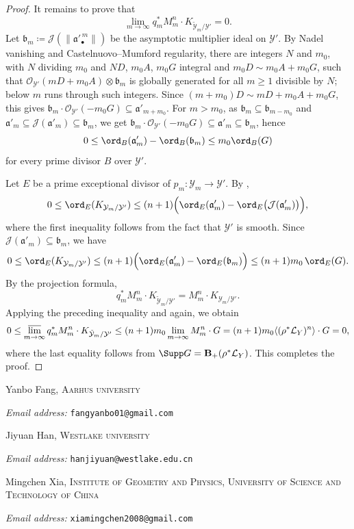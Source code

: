 \documentclass[11pt,a4paper]{article}
\begin{document}
\begin{proof}
It remains to prove that
\[
    \lim_{m\to\infty}q_m^*M_m^n\cdot K_{\tilde{\mathcal{Y}}_m/\mathcal{Y}'} = 0.
\]
Let $\mathfrak{b}_m\coloneqq\mathcal{J}(\|\mathfrak{a}'^{\,m}_{\bullet}\|)$ be the asymptotic multiplier ideal on $\mathcal{Y}'$. By Nadel vanishing and Castelnuovo--Mumford regularity, there are integers $N$ and $m_0$, with $N$ dividing $m_0$ and $ND$, $m_0A$, $m_0G$ integral and $m_0D\sim m_0A+m_0G$, such that $\mathcal{O}_{\mathcal{Y}'}(mD+m_0A)\otimes\mathfrak{b}_m$ is globally generated for all $m\geq1$ divisible by $N$; below $m$ runs through such integers. Since $(m+m_0)D\sim mD+m_0A+m_0G$, this gives $\mathfrak{b}_m\cdot\mathcal{O}_{\mathcal{Y}'}(-m_0G)\subseteq\mathfrak{a}'_{m+m_0}$. For $m>m_0$, as $\mathfrak{b}_m\subseteq\mathfrak{b}_{m-m_0}$ and $\mathfrak{a}'_m\subseteq\mathcal{J}(\mathfrak{a}'_m)\subseteq\mathfrak{b}_m$, we get $\mathfrak{b}_m\cdot\mathcal{O}_{\mathcal{Y}'}(-m_0G)\subseteq\mathfrak{a}'_m\subseteq\mathfrak{b}_m$, hence
\[
 0\leq\ord_B(\mathfrak{a}'_m)-\ord_B(\mathfrak{b}_m)\leq m_0\ord_B(G)
\]
for every prime divisor $B$ over $\mathcal{Y}'$.

Let $E$ be a prime exceptional divisor of $p_m\colon \mathcal{Y}_m\rightarrow \mathcal{Y}'$. By \cite[Proposition~A.1]{T26App}, 
\[
  0\leq  \ord_E(K_{\mathcal{Y}_m/\mathcal{Y}'})\leq (n+1)\Bigl(\ord_E(\mathfrak{a}'_m)-\ord_E\bigl(\mathcal{J}(\mathfrak{a}'_m)\bigr)\Bigr),
\]
where the first inequality follows from the fact that $\mathcal{Y}'$ is smooth. Since $\mathcal{J}(\mathfrak{a}'_m)\subseteq\mathfrak{b}_m$, we have
\[
    0\leq  \ord_E(K_{\mathcal{Y}_m/\mathcal{Y}'})\leq (n+1)\Bigl(\ord_E(\mathfrak{a}'_m)-\ord_E(\mathfrak{b}_m)\Bigr) \leq (n+1)m_0\,\ord_E(G).
\]
By the projection formula,
\[
    q_m^*M_m^n\cdot K_{\tilde{\mathcal{Y}}_m/\mathcal{Y}'} = M_m^n\cdot K_{\mathcal{Y}_m/\mathcal{Y}'}.
\]
Applying the preceding inequality and \cite[Proposition~4.1]{HL25} again, we obtain
\[
    0\leq \varlimsup_{m\to\infty}q_m^*M_m^n\cdot K_{\tilde{\mathcal{Y}}_m/\mathcal{Y}'} \leq (n+1)m_0\lim_{m\to\infty}M_m^n\cdot G = (n+1)m_0\langle (\rho^*\mathcal{L}_Y)^n\rangle\cdot G = 0,
\]
where the last equality follows from $\Supp G = \mathbf{B}_+(\rho^*\mathcal{L}_Y)$. This completes the proof.
\end{proof}





\printbibliography

Yanbo Fang, \textsc{Aarhus university}\par\nopagebreak
	\textit{Email address:} \texttt{fangyanbo01@gmail.com}

Jiyuan Han, \textsc{Westlake university}\par\nopagebreak
	\textit{Email address:} \texttt{hanjiyuan@westlake.edu.cn}

Mingchen Xia, \textsc{Institute of Geometry and Physics, University of Science and Technology of China}\par\nopagebreak
	\textit{Email address:} \texttt{xiamingchen2008@gmail.com}
\end{document}
